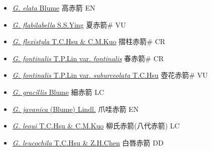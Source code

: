 \begin{itemize}
\begin{itemize}
        \item[] \href{http://www.theplantlist.org/tpl1.1/search?q=Gastrodia+elata}{\textit{G. elata} Blume}   高赤箭 EN
        \item[] \href{http://www.theplantlist.org/tpl1.1/search?q=Gastrodia+flabilabella}{\textit{G. flabilabella} S.S.Ying}   夏赤箭\# VU
        \item[] \href{http://www.theplantlist.org/tpl1.1/search?q=Gastrodia+flexistyla}{\textit{G. flexistyla} T.C.Hsu \& C.M.Kuo}   摺柱赤箭\# CR
        \item[] \href{http://www.theplantlist.org/tpl1.1/search?q=Gastrodia+fontinalis+var.+fontinalis}{\textit{G. fontinalis} T.P.Lin var. \textit{fontinalis}}   春赤箭\# CR
        \item[] \href{http://www.theplantlist.org/tpl1.1/search?q=Gastrodia+fontinalis+var.+suburceolata}{\textit{G. fontinalis} T.P.Lin var. \textit{suburceolata} T.C.Hsu}   壺花赤箭\# VU
        \item[] \href{http://www.theplantlist.org/tpl1.1/search?q=Gastrodia+gracillis}{\textit{G. gracillis} Blume}   細赤箭 LC
        \item[] \href{http://www.theplantlist.org/tpl1.1/search?q=Gastrodia+javanica}{\textit{G. javanica} (Blume) Lindl.}   爪哇赤箭 EN
        \item[] \href{http://www.theplantlist.org/tpl1.1/search?q=Gastrodia+leoui}{\textit{G. leoui} T.C.Hsu \& C.M.Kuo}     柳氏赤箭(八代赤箭)   LC
        \item[] \href{http://www.theplantlist.org/tpl1.1/search?q=Gastrodia+leucochila}{\textit{G. leucochila} T.C.Hsu \& Z.H.Chen}   白唇赤箭 DD

\end{itemize}
\end{itemize}

